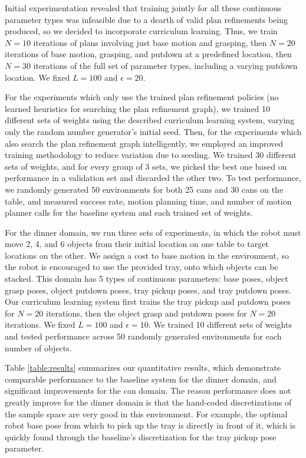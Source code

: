 Initial experimentation revealed that training jointly for all these continuous
parameter types was infeasible due to a dearth of valid plan refinements being produced, so we decided to
incorporate curriculum learning. Thus, we train $N = 10$ iterations of plans involving just base motion and grasping,
then $N = 20$ iterations of base motion, grasping, and putdown at a predefined location, then $N = 30$ iterations of
the full set of parameter types, including a varying putdown location. We fixed $L = 100$ and $\epsilon = 20$.

For the experiments which only use the trained plan refinement policies (no learned heuristics for searching the plan
refinement graph), we trained 10 different sets of weights using the described curriculum learning system, varying
only the random number generator's initial seed. Then, for the experiments which also search the plan refinement graph
intelligently, we employed an improved training methodology to reduce variation due to seeding. We trained 30 different
sets of weights, and for every group of 3 sets, we picked the best one based on performance in a validation set and discarded
the other two. To test performance, we randomly generated 50 environments for both 25 cans and 30 cans on the table,
and measured success rate, motion planning time, and number of motion planner calls for the baseline system and each
trained set of weights.

For the dinner domain, we run three sets of experiments, in which the robot must move 2, 4, and 6
objects from their initial location on one table to target locations on the other. We assign a cost to
base motion in the environment, so the robot is encouraged to use the provided tray, onto which objects can be stacked.
This domain has 5 types of continuous parameters: base poses, object grasp poses, object putdown poses, tray pickup
poses, and tray putdown poses. Our curriculum learning system first trains the tray pickup and putdown poses for
$N = 20$ iterations, then the object grasp and putdown poses for $N = 20$ iterations. We fixed $L = 100$ and $\epsilon = 10$.
We trained 10 different sets of weights and tested performance across 50 randomly generated
environments for each number of objects.

Table \ref{table:results} summarizes our quantitative results, which demonstrate
comparable performance to the baseline system for the dinner domain, and significant improvements for
the can domain. The reason performance does not greatly improve for the dinner domain is that the
hand-coded discretizations of the sample space are very good in this environment. For example, the optimal
robot base pose from which to pick up the tray is directly in front of it, which is quickly found through
the baseline's discretization for the tray pickup pose parameter.